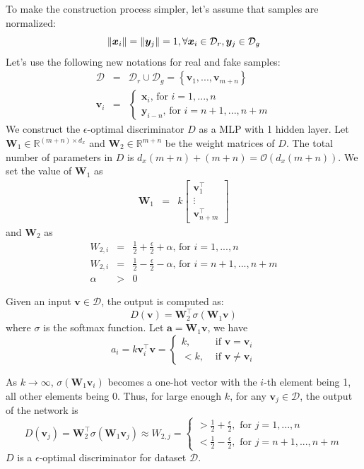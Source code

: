 \documentclass{article} %
\begin{document}
To make the construction process simpler, let's assume that samples are normalized:
\[ \norm{\bm x_i} = \norm{\bm y_j} = 1, \forall \bm x_i \in \mathcal{D}_r, \bm y_j \in \mathcal{D}_g \]
Let's use the following new notations for real and fake samples:
\begin{eqnarray*}
\mathcal{D} & = & \mathcal{D}_r \cup \mathcal{D}_g = \left\lbrace \bm v_1, ..., \bm v_{m + n} \right\rbrace \\
\bm v_i & = & 
\begin{cases}
\bm x_i \text{, for } i = 1, ..., n \\
\bm y_{i - n} \text{, for } i = n + 1, ..., n + m
\end{cases}
\end{eqnarray*}
We construct the $\epsilon$-optimal discriminator $D$ as a MLP with 1 hidden layer. Let $\bm W_1 \in \mathbb{R}^{(m + n) \times d_x}$ and $\bm W_2 \in \mathbb{R}^{m + n}$ be the weight matrices of $D$. The total number of parameters in $D$ is $d_x(m + n) + (m + n) = \mathcal{O}(d_x(m + n))$. We set the value of $\bm W_1$ as
\begin{eqnarray*}
\bm W_1 & = & k 
\left[
\begin{matrix}
\bm v_1^\top \\
\vdots \\
\bm v_{n + m}^\top
\end{matrix}
\right] 
\end{eqnarray*}
and $\bm W_2$ as
\begin{eqnarray*}
W_{2, i} & = & \frac{1}{2} + \frac{\epsilon}{2} + \alpha \text{, for } i = 1, ..., n \\
W_{2, i} & = & \frac{1}{2} - \frac{\epsilon}{2} - \alpha \text{, for } i = n + 1, ..., n + m \\
\alpha & > & 0
\end{eqnarray*}



Given an input $\bm v \in \mathcal{D}$, the output is computed as:
\[ D(\bm v) = \bm W_2^\top \sigma(\bm W_1 \bm v) \]
where $\sigma$ is the softmax function. Let $\bm a = \bm W_1 \bm v$, we have
\[ a_i = k \bm v_i^\top \bm v = 
\begin{cases}
k, & \text{ if } \bm v = \bm v_i \\
< k, & \text{ if } \bm v \neq \bm v_i
\end{cases}
 \]

As $k \rightarrow \infty$, $\sigma(\bm W_1 \bm v_i)$ becomes a one-hot vector with the $i$-th element being 1, all other elements being 0. Thus, for large enough $k$, for any $\bm v_j \in \mathcal{D}$, the output of the network is
\[ D(\bm v_j) = \bm W_2^\top \sigma(\bm W_1 \bm v_j) \approx W_{2, j} = 
\begin{cases}
> \frac{1}{2} + \frac{\epsilon}{2}, \text{ for } j = 1, ..., n \\
< \frac{1}{2} - \frac{\epsilon}{2}, \text{ for } j = n + 1, ..., n + m
\end{cases}
\]
$D$ is a $\epsilon$-optimal discriminator for dataset $\mathcal{D}$.
\end{document}
